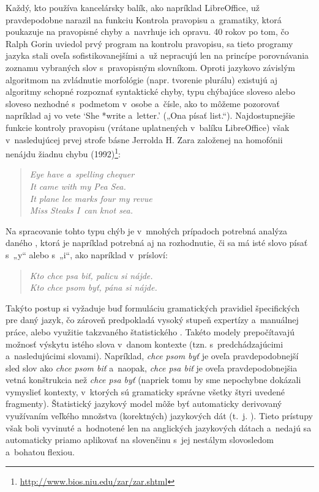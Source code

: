 \noindent Každý, kto používa kancelársky balík, ako napríklad LibreOffice, už pravdepodobne narazil na funkciu Kontrola pravopisu a~gramatiky, ktorá poukazuje na pravopisné chyby a~navrhuje ich opravu. 40 rokov po tom, čo Ralph Gorin uviedol prvý program na kontrolu pravopisu, sa tieto programy jazyka stali oveľa sofistikovanejšími a~už nepracujú len na princípe porovnávania zoznamu vybraných slov s~pravopisným slovníkom. Oproti jazykovo závislým algoritmom na zvládnutie morfológie (napr. tvorenie plurálu) existujú aj algoritmy schopné rozpoznať syntaktické chyby, typu chýbajúce sloveso alebo sloveso nezhodné s~podmetom v~osobe a~čísle, ako to môžeme pozorovať napríklad aj vo vete ‘She *write a~letter.’ („Ona písať list.“). Najdostupnejšie funkcie kontroly pravopisu (vrátane uplatnených v~balíku LibreOffice) však v~nasledujúcej prvej strofe básne Jerrolda H. Zara založenej na homofónii nenájdu žiadnu chybu (1992)\footnote{\url{http://www.bios.niu.edu/zar/zar.shtml}}:

\begin{verse}
\emph{%
Eye have a~spelling chequer\\
It came with my Pea Sea.\\
It plane lee marks four my revue\\
Miss Steaks I~can knot sea.
}
\end{verse}

Na spracovanie tohto typu chýb je v~mnohých prípadoch potrebná analýza daného , ktorá je napríklad potrebná aj na rozhodnutie, či sa má isté slovo písať s~„y“ alebo s~„i“, ako napríklad v~prísloví:

\begin{verse}
\emph{%
Kto chce psa biť, palicu si nájde.\\
\smallskip
Kto chce psom byť, pána si nájde.
}
\end{verse}

Takýto postup si vyžaduje buď formuláciu gramatických
pravidiel špecifických pre daný jazyk, čo zároveň predpokladá
vysoký stupeň expertízy a~manuálnej práce, alebo využitie
takzvaného štatistického . Takéto
modely prepočítavajú možnosť výskytu istého slova v~danom kontexte
(tzn. s~predchádzajúcimi a~nasledujúcimi slovami). Napríklad,
\emph{chce psom byť} je oveľa pravdepodobnejší sled slov ako
\emph{chce psom biť} a~naopak, \emph{chce psa biť} je oveľa
pravdepodobnejšia vetná konštrukcia než \emph{chce psa byť}
(napriek tomu by sme nepochybne dokázali vymyslieť kontexty,
v~ktorých sú gramaticky správne všetky štyri uvedené fragmenty).
Štatistický jazykový model môže byť automaticky derivovaný
využívaním veľkého množstva (korektných) jazykových dát (t.~j.
). Tieto prístupy však boli vyvinuté a~hodnotené
len na anglických jazykových dátach a~nedajú sa automaticky priamo
aplikovať na slovenčinu s~jej nestálym slovosledom a~bohatou flexiou.

